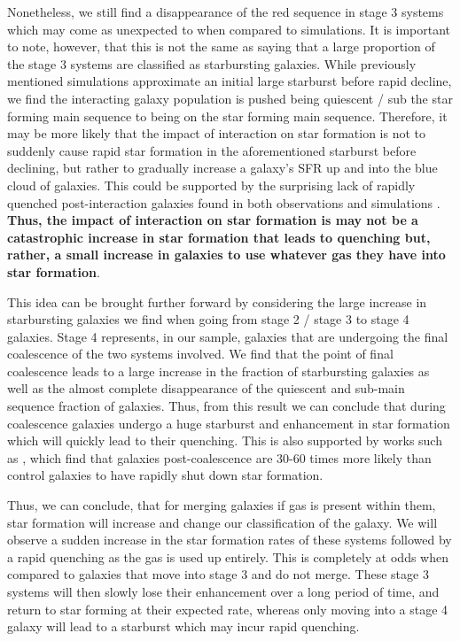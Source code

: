 Nonetheless, we still find a disappearance of the red sequence in stage 3 systems which may come as unexpected to when compared to simulations. It is important to note, however, that this is not the same as saying that a large proportion of the stage 3 systems are classified as starbursting galaxies. While previously mentioned simulations approximate an initial large starburst before rapid decline, we find the interacting galaxy population is pushed being quiescent / sub the star forming main sequence to being on the star forming main sequence. Therefore, it may be more likely that the impact of interaction on star formation is not to suddenly cause rapid star formation in the aforementioned starburst before declining, but rather to gradually increase a galaxy's SFR up and into the blue cloud of galaxies. This could be supported by the surprising lack of rapidly quenched post-interaction galaxies found in both observations \citep{2017ApJ...845..145W} and simulations \citep{2020MNRAS.493.3716H, 2021MNRAS.504.1888Q}. \textbf{Thus, the impact of interaction on star formation is may not be a catastrophic increase in star formation that leads to quenching but, rather, a small increase in galaxies to use whatever gas they have into star formation}. %

This idea can be brought further forward by considering the large increase in starbursting galaxies we find when going from stage 2 / stage 3 to stage 4 galaxies. Stage 4 represents, in our sample, galaxies that are undergoing the final coalescence of the two systems involved. We find that the point of final coalescence leads to a large increase in the fraction of starbursting galaxies as well as the almost complete disappearance of the quiescent and sub-main sequence fraction of galaxies. Thus, from this result we can conclude that during coalescence galaxies undergo a huge starburst and enhancement in star formation which will quickly lead to their quenching. This is also supported by works such as \citet{2022MNRAS.517L..92E}, which find that galaxies post-coalescence are 30-60 times more likely than control galaxies to have rapidly shut down star formation.

Thus, we can conclude, that for merging galaxies if gas is present within them, star formation will increase and change our classification of the galaxy. We will observe a sudden increase in the star formation rates of these systems followed by a rapid quenching as the gas is used up entirely. This is completely at odds when compared to galaxies that move into stage 3 and do not merge. These stage 3 systems will then slowly lose their enhancement over a long period of time, and return to star forming at their expected rate, whereas only moving into a stage 4 galaxy will lead to a starburst which may incur rapid quenching.

